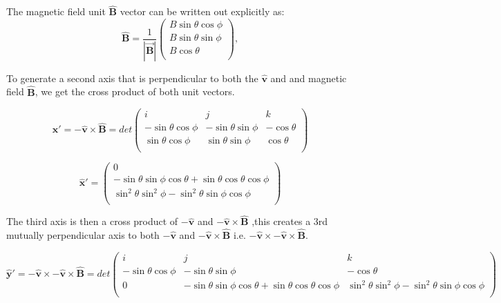 \documentclass[11pt]{article}
\begin{document}
The magnetic field unit $\mathbf{\hat{B}}$ vector can be written out explicitly as:
\begin{equation}
   \mathbf{\hat{B}}=\frac{1}{\mathbf{|\vec{B}|}} \left(
    \begin{array}{c}
    B\sin\theta \cos\phi \\ 	
    B\sin\theta \sin\phi \\ 
    B\cos\theta \\
\end{array} 
\right),  %
\end{equation}

To generate a second axis that is perpendicular to both the $\mathbf{\hat{v}}$ and and magnetic field  $\mathbf{\hat{B}}$, we get the cross product of both unit vectors.

\begin{equation}
    \mathbf{\hat{x}'} =\mathbf{-\hat{v}}\times \mathbf{\hat{B}} = det \left(
    \begin{array}{ccc}
    i & j & k \\ 	
   - \sin\theta \cos\phi & -\sin\theta \sin\phi  & -\cos\theta \\ 
     \sin\theta \cos\phi& \sin\theta \sin\phi  & \cos\theta\\
\end{array} 
\right)
\end{equation}

\begin{equation}
   \mathbf{\hat{x}'}=\left(
    \begin{array}{c}
   0\\ 	
    -\sin\theta\sin\phi\cos\theta+\sin\theta\cos\theta\cos\phi\\ 
    \sin^2\theta\sin^2\phi - \sin^2\theta\sin\phi\cos\phi \\
\end{array} 
\right) 
\end{equation}

The third axis is then a cross product of   $\mathbf{-\hat{v}}$ and $\mathbf{-\hat{v}}\times \mathbf{\hat{B}}$ ,this creates a 3rd mutually perpendicular axis to both $\mathbf{-\hat{v}}$ and $\mathbf{-\hat{v}}\times \mathbf{\hat{B}}$ i.e. $\mathbf{-\hat{v}} \times\mathbf{-\hat{v}}\times \mathbf{\hat{B}}$. 

\small
\begin{equation}
    \mathbf{\hat{y}'}=\mathbf{-\hat{v}}\times \mathbf{-\hat{v}\times\hat{B} } = det \left(
    \begin{array}{ccc}
    i & j & k \\ 	
   - \sin\theta \cos\phi & -\sin\theta \sin\phi  & -\cos\theta \\ 
     0& -\sin\theta\sin\phi\cos\theta+\sin\theta\cos\theta\cos\phi &  \sin^2\theta\sin^2\phi - \sin^2\theta\sin\phi\cos\phi \\
\end{array} 
\right)
\end{equation}
\end{document}
